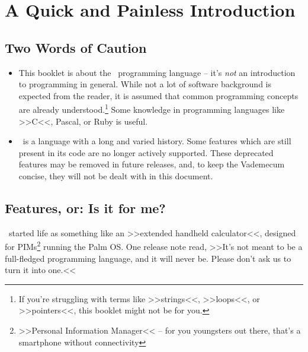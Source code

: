 \chapter{A Quick and Painless Introduction}


\section{Two Words of Caution}

\begin{itemize}

\item This booklet is about the \SB\ programming language -- it's
\emph{not} an introduction to programming in general. While not a lot of
software background is expected from the reader, it is assumed that
common programming concepts are already understood.\footnote{If you're
struggling with terms like >>strings<<, >>loops<<, or >>pointers<<, this
booklet might not be for you.} Some knowledge in programming languages
like >>C<<, Pascal, or Ruby is useful.

\item \SB\ is a language with a long and varied history.  Some features
which are still present in its code are no longer actively supported.
These deprecated features may be removed in future releases, and, to
keep the Vademecum concise, they will not be dealt with in this
document.

\end{itemize}

\section{Features, or: Is it for me?}

\SB\ started life as something like an >>extended handheld calculator<<,
designed for PIMs\footnote{>>Personal Information Manager<< -- for you
youngsters out there, that's a smartphone without connectivity} running
the Palm OS. One release note read, >>It's not meant to be a
full-fledged programming language, and it will never be. Please don't
ask us to turn it into one.<<

